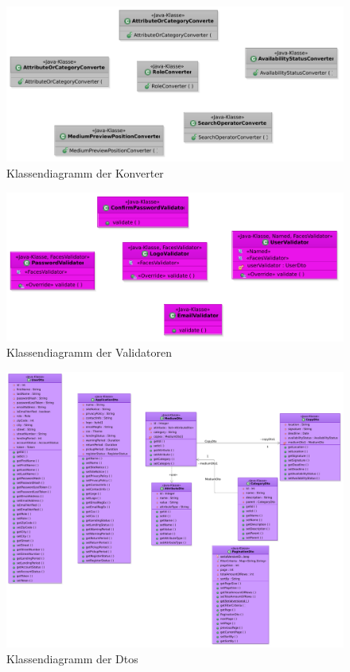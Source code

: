 \documentclass{article}
\begin{document}
\begin{figure}[H]
		\centering
		\includegraphics[width = 52em]{Klassendiagramm-Convertors}
		\caption{Klassendiagramm der Konverter}
	\end{figure}

\begin{figure}[H]
\hypertarget{Validator}{}
		\centering
		\includegraphics[width = 52em]{KlassendiagrammValidators}
		\caption{Klassendiagramm der Validatoren}
	\end{figure}


\begin{figure}[H]
		\centering
		\includegraphics[angle=270, width = 52em]{Klassendiagramm-Dtoss_1}
		\caption{Klassendiagramm der Dtos}
	\end{figure}
\end{document}
